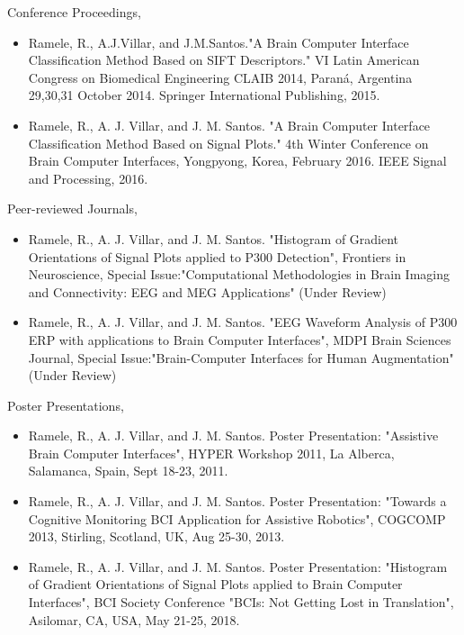 \documentclass[11pt,twoside,openright]{moddalthesis}
\theoremstyle{definition}
\begin{document}
\begin{listofpubs}

\vspace{-\baselineskip}
\vspace{-\baselineskip}


Conference Proceedings,

\begin{itemize}
\item Ramele, R., A.J.Villar, and J.M.Santos."A Brain Computer Interface Classification Method Based on SIFT Descriptors." VI Latin American Congress on Biomedical Engineering CLAIB 2014, Paraná, Argentina 29,30,31 October 2014. Springer International Publishing, 2015.
\item Ramele, R., A. J. Villar, and J. M. Santos. "A Brain Computer Interface Classification Method Based on Signal Plots." 4th Winter Conference on Brain Computer Interfaces, Yongpyong, Korea, February 2016. IEEE Signal and Processing, 2016. 
\end{itemize}

Peer-reviewed Journals,

\begin{itemize}
\item Ramele, R., A. J. Villar, and J. M. Santos. "Histogram of Gradient Orientations of Signal Plots applied to P300 Detection", Frontiers in Neuroscience, Special Issue:"Computational Methodologies in Brain Imaging and Connectivity: EEG and MEG Applications" (Under Review)
\item Ramele, R., A. J. Villar, and J. M. Santos. "EEG Waveform Analysis of P300 ERP with applications to Brain Computer Interfaces", MDPI Brain Sciences Journal, Special Issue:"Brain-Computer Interfaces for Human Augmentation" (Under Review)
\end{itemize}


Poster Presentations,

\begin{itemize}
\item Ramele, R., A. J. Villar, and J. M. Santos. Poster Presentation: "Assistive Brain Computer Interfaces", HYPER Workshop 2011, La Alberca, Salamanca, Spain, Sept 18-23, 2011.
\item Ramele, R., A. J. Villar, and J. M. Santos. Poster Presentation: "Towards a Cognitive Monitoring BCI Application for Assistive Robotics", COGCOMP 2013, Stirling, Scotland, UK, Aug 25-30, 2013.
\item Ramele, R., A. J. Villar, and J. M. Santos. Poster Presentation: "Histogram of Gradient Orientations of Signal Plots applied to Brain Computer Interfaces", BCI Society Conference "BCIs: Not Getting Lost in Translation", Asilomar, CA, USA, May 21-25, 2018.
\end{itemize}

\end{listofpubs}
\end{document}
